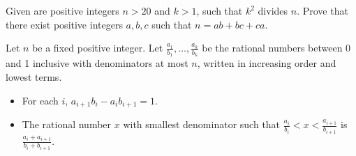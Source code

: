 \begin{problem}{\label{p:i:n:pr:80}}
  Given are positive integers $n>20$ and $k>1$, such that $k^2$ divides
      $n$. Prove that there exist
      positive integers $a, b, c$ such that $n=ab+bc+ca$.
\end{problem}
\begin{result}{\label{r:i:n:pr:6}}
  Let $n$ be a fixed positive integer. Let
    $\frac{a_1}{b_1},\ldots,\frac{a_k}{b_k}$ be the rational numbers between 0
    and 1 inclusive with denominators at most $n$, written in increasing order
    and lowest terms.
    \begin{itemize}
      \item For each $i$, $a_{i+1}b_i-a_i b_{i+1}=1$.
      \item The rational number $x$ with smallest denominator such
        that $\frac{a_i}{b_i}<x<\frac{a_{i+1}}{b_{i+1}}$ is
        $\frac{a_i+a_{i+1}}{b_i+b_{i+1}}$. 
    \end{itemize}
\end{result}
